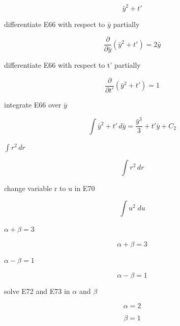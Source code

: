 \documentclass[dvipdfmx]{article}
\begin{document}
\begin{equation}
  \bar{y}^2 + t'
  \label{eq:E66}
\end{equation}

differentiate E66 with respect to $\bar{y}$ partially

\begin{equation}
  \frac{\partial}{\partial \bar{y}}\left(\bar{y}^2 + t'\right) = 2 \bar{y}
  \label{eq:E67}
\end{equation}

differentiate E66 with respect to t' partially

\begin{equation}
  \frac{\partial}{\partial t'}\left(\bar{y}^2 + t'\right) = 1
  \label{eq:E68}
\end{equation}

integrate E66 over $\bar{y}$

\begin{equation}
  \int \bar{y}^2 + t' \, d\bar{y} = \frac{\bar{y}^3}{3}+t' \bar{y} + C_2
  \label{eq:E69}
\end{equation}

$\int r^2 \, dr$

\begin{equation}
  \int r^2 \, dr
  \label{eq:E70}
\end{equation}

change variable r to u in E70

\begin{equation}
  \int {u^2}{\;du}
  \label{eq:E71}
\end{equation}

$\alpha + \beta = 3$

\begin{equation}
  \alpha + \beta = 3
  \label{eq:E72}
\end{equation}

$\alpha - \beta = 1$

\begin{equation}
  \alpha - \beta = 1
  \label{eq:E73}
\end{equation}

solve E72 and E73 in $\alpha$ and $\beta$

\begin{equation}
  \alpha = 2
  \label{eq:E74}
\end{equation}

\begin{equation}
  \beta = 1
  \label{eq:E75}
\end{equation}
\end{document}
